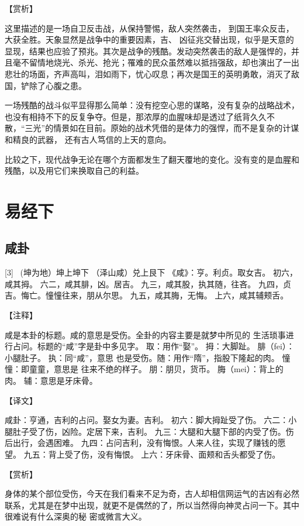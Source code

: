 \documentclass[12pt,UTF8]{ctexbook}
\begin{document}
【赏析】

这里描述的是一场自卫反击战，从保持警惕，敌人突然袭击， 到国王率众反击，大获全胜。天象显然是战争中的重要因素，吉、 凶征兆交替出现，似乎是天意的显现，结果也应验了预兆。其次是战争的残酷。发动突然袭击的敌人是强悍的，并且毫不留情地烧光、杀光、抢光；罹难的民众虽然难以抵挡强敌，却也演出了一出悲壮的场面，齐声高叫，泪如雨下，忧心叹息；再次是国王的英明勇敢，消灭了敌国，铲除了心腹之患。

一场残酷的战斗似平显得那么简单：没有挖空心思的谋略，没有复杂的战略战术，也没有相持不下的反复争夺。但是，那浓厚的血腥味却是透过了纸背久久不散，“三光”的情景如在目前。原始的战术凭借的是体力的强悍，而不是复杂的计谋和精良的武器， 还有古人笃信的上天的意向。

比较之下，现代战争无论在哪个方面都发生了翻天覆地的变化。没有变的是血腥和残酷，以及用它们来换取自己的利益。

\part{易经下}

\chapter{咸卦}
[3] \ (坤为地）坤上坤下
（泽山咸）兑上艮下
《咸》：亨。利贞。取女吉。
初六，咸其拇。
六二，咸其腓，凶。居吉。
九三，咸其股，执其随，往吝。
九四，贞吉。悔亡。憧憧往来，朋从尔思。
九五，咸其脢，无悔。
上六，咸其辅颊舌。

【注释】

咸是本卦的标题。咸的意思是受伤。全卦的内容主要是就梦中所见的 生活琐事进行占问。标题的“咸”字是卦中多见字。
取：用作“娶”。
拇：大脚趾。
腓（fei）：小腿肚子。
执：同“咸”，意思 也是受伤。随：用作“隋”，指股下隆起的肉。
憧憧：即童童，意思是 往来不绝的样子。
朋：朋贝，货币。
脢（mei）：背上的肉。
辅：意思是牙床骨。

【译文】

咸卦：亨通，吉利的占问。娶女为妻。吉利。
初六：脚大拇趾受了伤。
六二：小腿肚子受了伤，凶险。定居下来，吉利。
九三：大腿和大腿下部的内受了伤。伤后出行，会遇困难。
九四：占问吉利，没有悔恨。人来人往，实现了赚钱的愿望。
九五：背上受了伤，没有悔恨。
上六：牙床骨、面颊和舌头都受了伤。

【赏析】

身体的某个部位受伤，今天在我们看来不足为奇，古人却相信网运气的吉凶有必然联系，尤其是在梦中出现，就更不是偶然的了，所以当然得向神灵占问一下。其中很难说有什么深奥的秘 密或微言大义。
\end{document}
